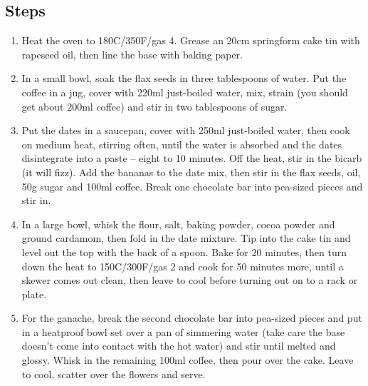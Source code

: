 \documentclass{book}
\begin{document}
\subsection*{Steps}
\begin{enumerate}
\item Heat the oven to 180C/350F/gas 4. Grease an 20cm springform cake tin with rapeseed oil, then line the base with baking paper.
\item In a small bowl, soak the flax seeds in three tablespoons of water. Put the coffee in a jug, cover with 220ml just-boiled water, mix, strain (you should get about 200ml coffee) and stir in two tablespoons of sugar.
\item Put the dates in a saucepan, cover with 250ml just-boiled water, then cook on medium heat, stirring often, until the water is absorbed and the dates disintegrate into a paste – eight to 10 minutes. Off the heat, stir in the bicarb (it will fizz). Add the bananas to the date mix, then stir in the flax seeds, oil, 50g sugar and 100ml coffee. Break one chocolate bar into pea-sized pieces and stir in.
\item In a large bowl, whisk the flour, salt, baking powder, cocoa powder and ground cardamom, then fold in the date mixture. Tip into the cake tin and level out the top with the back of a spoon. Bake for 20 minutes, then turn down the heat to 150C/300F/gas 2 and cook for 50 minutes more, until a skewer comes out clean, then leave to cool before turning out on to a rack or plate.
\item For the ganache, break the second chocolate bar into pea-sized pieces and put in a heatproof bowl set over a pan of simmering water (take care the base doesn’t come into contact with the hot water) and stir until melted and glossy. Whisk in the remaining 100ml coffee, then pour over the cake. Leave to cool, scatter over the flowers and serve.
\end{enumerate}
\newpage
\end{document}
